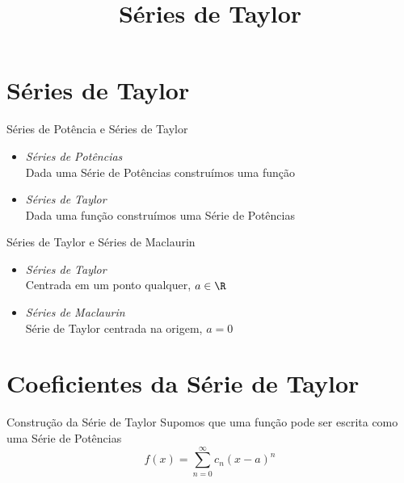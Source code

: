 \documentclass[fleqn,utf8,aspectratio=169,12pt]{beamer}
\title{Séries de Taylor}
\begin{document}
\addtitle

\section{Séries de Taylor}

\begin{frame}{Séries de Potência e Séries de Taylor}
  \begin{itemize}[<+->]
    \item \emph{Séries de Potências}                          \\[3mm]
          Dada uma Série de Potências construímos uma função  \\[11mm]
    \item \emph{Séries de Taylor}                             \\[3mm]
          Dada uma função construímos uma Série de Potências
  \end{itemize}
\end{frame}

\begin{frame}{Séries de Taylor e Séries de Maclaurin}
  \begin{itemize}[<+->]
    \item \emph{Séries de Taylor}                     \\[3mm]
    Centrada em um ponto qualquer, \emph{$a\in\R$}    \\[11mm]
    \item \emph{Séries de Maclaurin}                  \\[3mm]
    Série de Taylor centrada na origem, \emph{$a=0$}
  \end{itemize}
\end{frame}

\section{Coeficientes da Série de Taylor}

\begin{frame}{Construção da Série de Taylor}
  Supomos que uma função pode ser escrita como uma Série de Potências
  \[
    f(x) = \sum_{n=0}^{\infty} c_n (x-a)^n
  \]
\end{frame}
\end{document}
